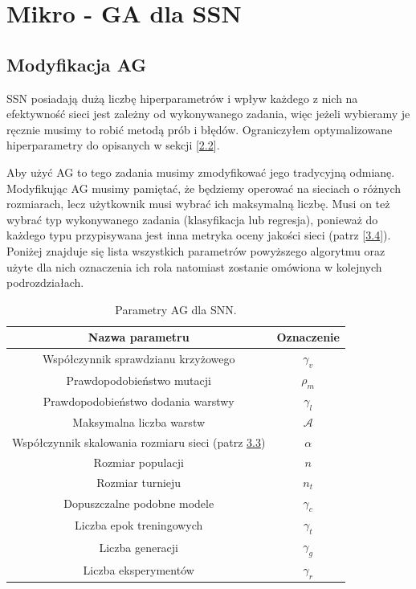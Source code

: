 \documentclass{article}
\begin{document}
\section{Mikro - GA dla SSN}
\subsection{Modyfikacja AG}
SSN posiadają dużą liczbę hiperparametrów i wpływ każdego z nich na efektywność sieci jest
zależny od wykonywanego zadania, więc jeżeli wybieramy je ręcznie musimy to robić
metodą prób i błędów. Ograniczyłem optymalizowane hiperparametry do opisanych w sekcji
[\hyperref[sec:ssn]{2.2}].

Aby użyć AG to tego zadania musimy zmodyfikować jego tradycyjną odmianę.
Modyfikując AG musimy pamiętać, że będziemy operować na sieciach o różnych rozmiarach, lecz
użytkownik musi wybrać ich maksymalną liczbę. Musi on też wybrać typ wykonywanego zadania 
(klasyfikacja lub regresja), ponieważ do każdego typu przypisywana jest inna metryka
oceny jakości sieci (patrz [\hyperref[sec:ocena]{3.4}]).\\
Poniżej znajduje się lista wszystkich 
parametrów powyższego algorytmu oraz użyte dla nich oznaczenia
ich rola natomiast zostanie omówiona w kolejnych podrozdziałach.
\begin{table}[!h]
\centering
\begin{tabular}{|c|c|}
	\hline
	Nazwa parametru & Oznaczenie \\
	\hline
	Współczynnik sprawdzianu krzyżowego & $\gamma_v$ \\
	Prawdopodobieństwo mutacji & $\rho_m$ \\
	Prawdopodobieństwo dodania warstwy & $\gamma_l$ \\
	Maksymalna liczba warstw & $\mathcal{A}$ \\
	Współczynnik skalowania rozmiaru sieci (patrz \hyperref[sec:ocena]{3.3}) & $\alpha$ \\
	Rozmiar populacji & $n$ \\
	Rozmiar turnieju & $n_t$ \\
	Dopuszczalne podobne modele & $\gamma_c$\\
	Liczba epok treningowych & $\gamma_t$\\
	Liczba generacji & $\gamma_g$\\
	Liczba eksperymentów & $\gamma_r$\\
	\hline
\end{tabular}
\caption{\label{tab:params}Parametry AG dla SNN.}
\end{table}
\end{document}
